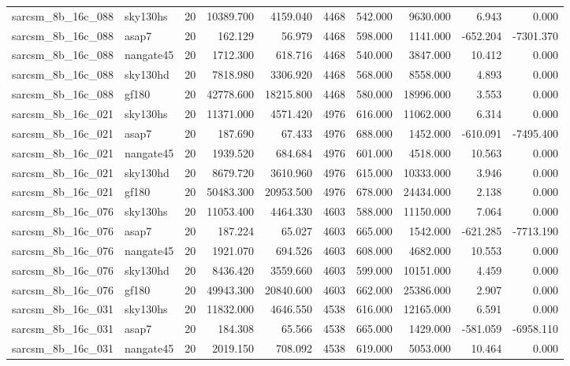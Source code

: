 \begin{longtable}{llrrrrrrrr}
sarcsm\_8b\_16c\_088 & sky130hs & 20 & 10389.700 & 4159.040 & 4468 & 542.000 & 9630.000 & 6.943 & 0.000 \\
sarcsm\_8b\_16c\_088 & asap7 & 20 & 162.129 & 56.979 & 4468 & 598.000 & 1141.000 & -652.204 & -7301.370 \\
sarcsm\_8b\_16c\_088 & nangate45 & 20 & 1712.300 & 618.716 & 4468 & 540.000 & 3847.000 & 10.412 & 0.000 \\
sarcsm\_8b\_16c\_088 & sky130hd & 20 & 7818.980 & 3306.920 & 4468 & 568.000 & 8558.000 & 4.893 & 0.000 \\
sarcsm\_8b\_16c\_088 & gf180 & 20 & 42778.600 & 18215.800 & 4468 & 580.000 & 18996.000 & 3.553 & 0.000 \\
sarcsm\_8b\_16c\_021 & sky130hs & 20 & 11371.000 & 4571.420 & 4976 & 616.000 & 11062.000 & 6.314 & 0.000 \\
sarcsm\_8b\_16c\_021 & asap7 & 20 & 187.690 & 67.433 & 4976 & 688.000 & 1452.000 & -610.091 & -7495.400 \\
sarcsm\_8b\_16c\_021 & nangate45 & 20 & 1939.520 & 684.684 & 4976 & 601.000 & 4518.000 & 10.563 & 0.000 \\
sarcsm\_8b\_16c\_021 & sky130hd & 20 & 8679.720 & 3610.960 & 4976 & 615.000 & 10333.000 & 3.946 & 0.000 \\
sarcsm\_8b\_16c\_021 & gf180 & 20 & 50483.300 & 20953.500 & 4976 & 678.000 & 24434.000 & 2.138 & 0.000 \\
sarcsm\_8b\_16c\_076 & sky130hs & 20 & 11053.400 & 4464.330 & 4603 & 588.000 & 11150.000 & 7.064 & 0.000 \\
sarcsm\_8b\_16c\_076 & asap7 & 20 & 187.224 & 65.027 & 4603 & 665.000 & 1542.000 & -621.285 & -7713.190 \\
sarcsm\_8b\_16c\_076 & nangate45 & 20 & 1921.070 & 694.526 & 4603 & 608.000 & 4682.000 & 10.553 & 0.000 \\
sarcsm\_8b\_16c\_076 & sky130hd & 20 & 8436.420 & 3559.660 & 4603 & 599.000 & 10151.000 & 4.459 & 0.000 \\
sarcsm\_8b\_16c\_076 & gf180 & 20 & 49943.300 & 20840.600 & 4603 & 662.000 & 25386.000 & 2.907 & 0.000 \\
sarcsm\_8b\_16c\_031 & sky130hs & 20 & 11832.000 & 4646.550 & 4538 & 616.000 & 12165.000 & 6.591 & 0.000 \\
sarcsm\_8b\_16c\_031 & asap7 & 20 & 184.308 & 65.566 & 4538 & 665.000 & 1429.000 & -581.059 & -6958.110 \\
sarcsm\_8b\_16c\_031 & nangate45 & 20 & 2019.150 & 708.092 & 4538 & 619.000 & 5053.000 & 10.464 & 0.000 \\

\end{longtable}

